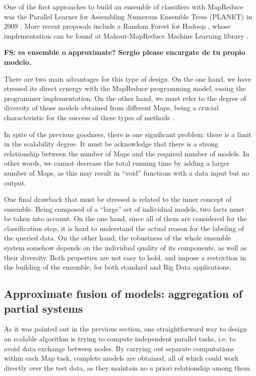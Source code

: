 \documentclass[3p,review]{elsarticle}
\begin{document}
One of the first approaches to build an ensemble of classifiers with MapReduce was the Parallel Learner for Assembling Numerous
Ensemble Trees (PLANET) in 2009 \cite{Panda09-DT-RF}. More recent proposals include a Random Forest for Hadoop \cite{Assun13-RF-H,Wang13-RF-H}, whose implementation can be found at Mahout-MapReduce Machine Learning library \cite{Mahout11,Mahout17}.


\textbf{FS: \cite{Ramirez-Gallego17-mrmr} es ensemble o approximate? Sergio please encargate de tu propio modelo.}


There are two main advantages for this type of design. On the one hand, we have stressed its direct synergy with the MapReduce programming model, easing the programmer implementation. On the other hand, we must refer to the degree of diversity of those models obtained from different Maps, being a crucial characteristic for the success of these types of methods \cite{Kuncheva05}. 

In spite of the previous goodness, there is one significant problem: there is a limit in the scalability degree. It must be acknowledge that there is a strong relationship between the number of Maps and the required number of models. In other words, we cannot decrease the total running time by adding a larger number of Maps, as this may result in ``void'' functions with a data input but no output. 

One final drawback that must be stressed is related to the inner concept of ensemble. Being composed of a ``large'' set of individual models, two facts must be taken into account. On the one hand, since all of them are considered for the classification step, it is hard to understand the actual reason for the labeling of the queried data. On the other hand, the robustness of the whole ensemble system somehow depends on the individual quality of its components, as well as their diversity. Both properties are not easy to hold, and impose a restriction in the building of the ensemble, for both standard and Big Data applications.

\subsection{Approximate fusion of models: aggregation of partial systems}\label{subsec:submodels}

As it was pointed out in the previous section, one straightforward way to design an scalable algorithm is trying to compute independent parallel tasks, i.e. to avoid data exchange between nodes. By carrying out separate computations within each Map task, complete models are obtained, all of which could work directly over the test data, as they maintain no a priori relationship among them. %
\end{document}
